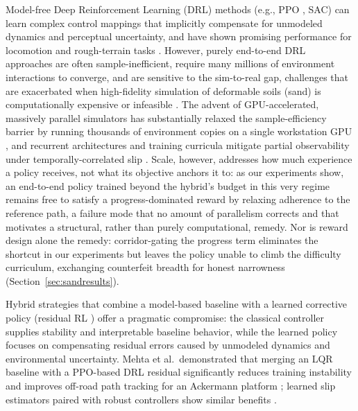 \documentclass[conference]{IEEEtran}
\begin{document}
Model-free Deep Reinforcement Learning (DRL) methods (e.g., PPO \cite{schulman2017proximal}, SAC) can learn complex control mappings that implicitly compensate for unmodeled dynamics and perceptual uncertainty, and have shown promising performance for locomotion and rough-terrain tasks \cite{wiberg2021rough, gunma2024sac, lee2020learning}. However, purely end-to-end DRL approaches are often sample-inefficient, require many millions of environment interactions to converge, and are sensitive to the sim-to-real gap, challenges that are exacerbated when high-fidelity simulation of deformable soils (sand) is computationally expensive or infeasible \cite{blum2020ppmc, mortensen2023teacher}. The advent of GPU-accelerated, massively parallel simulators has substantially relaxed the sample-efficiency barrier by running thousands of environment copies on a single workstation GPU \cite{makoviychuk2021isaac, rudin2022learning, mittal2023orbit}, and recurrent architectures and training curricula mitigate partial observability under temporally-correlated slip \cite{alcayaga2025lstm}. Scale, however, addresses how much experience a policy receives, not what its objective anchors it to: as our experiments show, an end-to-end policy trained beyond the hybrid's budget in this very regime remains free to satisfy a progress-dominated reward by relaxing adherence to the reference path, a failure mode that no amount of parallelism corrects and that motivates a structural, rather than purely computational, remedy. Nor is reward design alone the remedy: corridor-gating the progress term eliminates the shortcut in our experiments but leaves the policy unable to climb the difficulty curriculum, exchanging counterfeit breadth for honest narrowness (Section~\ref{sec:sandresults}).

Hybrid strategies that combine a model-based baseline with a learned corrective policy (residual RL \cite{johannink2019residual, silver2018residual}) offer a pragmatic compromise: the classical controller supplies stability and interpretable baseline behavior, while the learned policy focuses on compensating residual errors caused by unmodeled dynamics and environmental uncertainty. Mehta et al.\ demonstrated that merging an LQR baseline with a PPO-based DRL residual significantly reduces training instability and improves off-road path tracking for an Ackermann platform \cite{mehta2024hybrid}; learned slip estimators paired with robust controllers show similar benefits \cite{nourizadeh2023sliding}.
\end{document}
